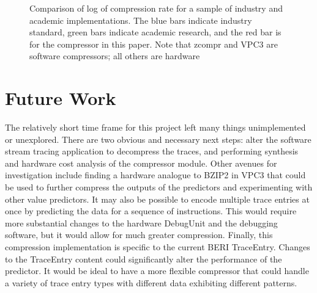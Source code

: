 \documentclass[conference]{IEEEtran}
\begin{document}
 \begin{figure}
 \label{comparison}
 \caption{Comparison of log of compression rate for a sample of industry and academic implementations. The blue bars indicate industry standard, green bars indicate academic research, and the red bar is for the compressor in this paper. Note that zcompr and VPC3 are software compressors; all others are hardware}

 \end{figure}
  

\section{Future Work}
The relatively short time frame for this project left many things unimplemented or unexplored. There are two obvious and necessary next steps: alter the software stream tracing application to decompress the traces, and performing synthesis and hardware cost analysis of the compressor module. Other avenues for investigation include finding a hardware analogue to BZIP2 in VPC3 that could be used to further compress the outputs of the predictors and experimenting with other value predictors. It may also be possible to encode multiple trace entries at once by predicting the data for a sequence of instructions. This would require more substantial changes to the hardware DebugUnit and the debugging software, but it would allow for much greater compression. Finally, this compression implementation is specific to the current BERI TraceEntry. Changes to the TraceEntry content could significantly alter the performance of the predictor. It would be ideal to have a more flexible compressor that could handle a variety of trace entry types with different data exhibiting different patterns.
\end{document}

